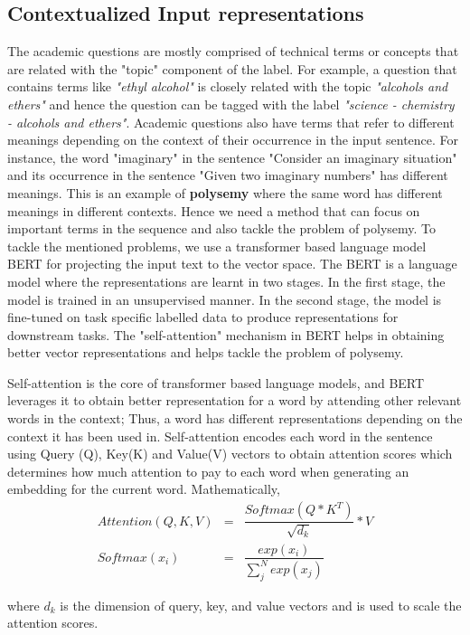 \documentclass[runningheads, envcountsame, a4paper]{llncs}
\begin{document}
\subsection{Contextualized Input representations}
The academic questions are mostly comprised of technical terms or concepts that are related with the "topic" component of the label. For example, a question that contains terms like \textit{"ethyl alcohol"} is closely related with the topic \textit{"alcohols and ethers"} and hence the question can be tagged with the label \textit{"science - chemistry - alcohols and ethers"}. Academic questions also have terms that refer to different meanings depending on the context of their occurrence in the input sentence. For instance, the word "imaginary" in the sentence "Consider an imaginary situation" and its occurrence in the sentence "Given two imaginary numbers" has different meanings. This is an example of \textbf{polysemy} where the same word has different meanings in different contexts. Hence we need a method that can focus  on important terms in the sequence and also tackle the problem of polysemy. To tackle the mentioned problems, we use a transformer based language model BERT for projecting the input text to the vector space. The BERT is a language model where the representations are learnt in two stages. In the first stage, the model is trained in an unsupervised manner. In the second stage, the model is fine-tuned on task specific labelled data to produce representations for downstream tasks. The "self-attention" mechanism in BERT helps in obtaining better vector representations and helps tackle the problem of polysemy.


Self-attention \cite{vaswani2017attention} is the core of transformer based language models, and BERT leverages it to obtain better representation for a word by attending other relevant words in the context; Thus, a word has different representations depending on the context it has been used in. Self-attention encodes each word in the sentence using Query (Q), Key(K) and Value(V) vectors to obtain attention scores which determines how much attention to pay to each word when generating an embedding for the current word. Mathematically, 
\begin{eqnarray}
        Attention(Q,K,V) & = & \dfrac{Softmax(Q * K^T)}{\sqrt{d_k}} *V \\
        Softmax(x_i) & = & \dfrac{exp(x_i)}{\sum_j^N exp(x_j)} 
\end{eqnarray}

where $d_k$ is the dimension of query, key, and value vectors and is used to scale the attention scores. 
\end{document}
